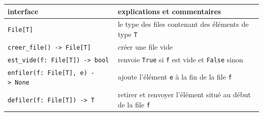 \documentclass[a4paper,17pt]{extarticle}
\begin{document}
\begin{longtable}[]{@{}ll@{}}
\toprule
\begin{minipage}[b]{0.47\columnwidth}\raggedright
\textbf{interface}\strut
\end{minipage} & \begin{minipage}[b]{0.47\columnwidth}\raggedright
\textbf{explications et commentaires}\strut
\end{minipage}\tabularnewline
\midrule
\endhead
\begin{minipage}[t]{0.47\columnwidth}\raggedright
\texttt{File{[}T{]}}\strut
\end{minipage} & \begin{minipage}[t]{0.47\columnwidth}\raggedright
le type des files contenant des éléments de type \texttt{T}\strut
\end{minipage}\tabularnewline
\begin{minipage}[t]{0.47\columnwidth}\raggedright
\texttt{creer\_file()\ -\textgreater{}\ File{[}T{]}}\strut
\end{minipage} & \begin{minipage}[t]{0.47\columnwidth}\raggedright
créer une file vide\strut
\end{minipage}\tabularnewline
\begin{minipage}[t]{0.47\columnwidth}\raggedright
\texttt{est\_vide(f:\ File{[}T{]})\ -\textgreater{}\ bool}\strut
\end{minipage} & \begin{minipage}[t]{0.47\columnwidth}\raggedright
renvoie \texttt{True} si \texttt{f} est vide et \texttt{False}
sinon\strut
\end{minipage}\tabularnewline
\begin{minipage}[t]{0.47\columnwidth}\raggedright
\texttt{enfiler(f:\ File{[}T{]},\ e)\ -\textgreater{}\ None}\strut
\end{minipage} & \begin{minipage}[t]{0.47\columnwidth}\raggedright
ajoute l'élément \texttt{e} à la fin de la file \texttt{f}\strut
\end{minipage}\tabularnewline
\begin{minipage}[t]{0.47\columnwidth}\raggedright
\texttt{defiler(f:\ File{[}T{]})\ -\textgreater{}\ T}\strut
\end{minipage} & \begin{minipage}[t]{0.47\columnwidth}\raggedright
retirer et renvoyer l'élément situé au début de la file \texttt{f}\strut
\end{minipage}\tabularnewline
\bottomrule
\end{longtable}
\end{document}
